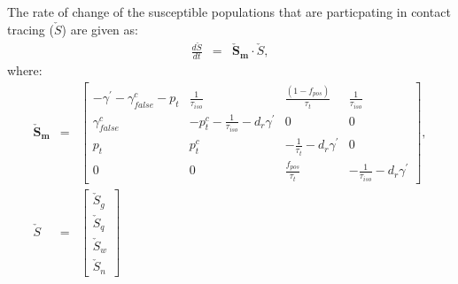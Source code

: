 \documentclass[notitlepage, superscriptaddress]{revtex4-2}
\begin{document}
The rate of change of the susceptible populations that are particpating in contact tracing ($\check{S}$) are given as:
\begin{eqnarray}
\frac{d\check{S}}{dt} &=& \boldsymbol{\check{S}_{m}} \cdot \check{S},
\end{eqnarray}
where:
\begin{eqnarray}
\boldsymbol{\check{S}_{m}} &=&
\begin{bmatrix}
-\gamma^{'} -\gamma^{c}_{false} - p_{t}  & \frac{1}{\tau_{iso}}     & \frac{(1-f_{pos})}{\tau_{t}}             & \frac{1}{\tau_{iso}} \\ 
\gamma^{c}_{false}          &  -p^{c}_{t}  - \frac{1}{\tau_{iso}} -d_{r} \gamma^{'}          &  0    & 0  \\ 
p_{t}                          &  p^{c}_{t}                  &  -\frac{1}{\tau_{t}}  -d_{r} \gamma^{'}  & 0 \\
0 & 0 & \frac{f_{pos}}{\tau_{t}}  & -\frac{1}{\tau_{iso}}  -d_{r} \gamma^{'}
\end{bmatrix}, \\
\check{S} &=& 
\begin{bmatrix}
\check{S}_{g} \\ \check{S}_{q} \\ \check{S}_{w}\\ \check{S}_{n}
\end{bmatrix}
\end{eqnarray}

\end{document}
